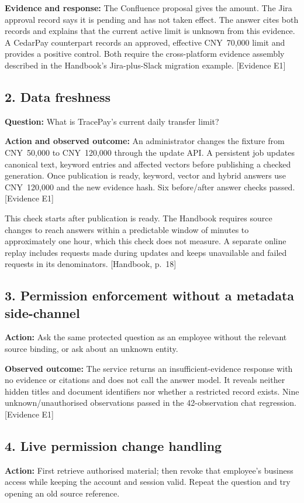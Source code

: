 \documentclass[10pt,a4paper]{article}
\newcommand{\hb}[1]{{\footnotesize\textcolor{Muted}{[Handbook, p.~#1]}}}
\newcommand{\evidence}[1]{{\footnotesize\textcolor{Muted}{[Evidence #1]}}}
\begin{document}
\textbf{Evidence and response:} The Confluence proposal gives the amount. The Jira approval record says it is pending and has not taken effect. The answer cites both records and explains that the current active limit is unknown from this evidence. A CedarPay counterpart records an approved, effective CNY~70,000 limit and provides a positive control. Both require the cross-platform evidence assembly described in the Handbook's Jira-plus-Slack migration example. \evidence{E1}

\subsection{2. Data freshness}
\textbf{Question:} What is TracePay's current daily transfer limit?

\textbf{Action and observed outcome:} An administrator changes the fixture from CNY~50,000 to CNY~120,000 through the update API. A persistent job updates canonical text, keyword entries and affected vectors before publishing a checked generation. Once publication is ready, keyword, vector and hybrid answers use CNY~120,000 and the new evidence hash. Six before/after answer checks passed. \evidence{E1}

This check starts after publication is ready. The Handbook requires source changes to reach answers within a predictable window of minutes to approximately one hour, which this check does not measure. A separate online replay includes requests made during updates and keeps unavailable and failed requests in its denominators. \hb{18}

\subsection{3. Permission enforcement without a metadata side-channel}
\textbf{Action:} Ask the same protected question as an employee without the relevant source binding, or ask about an unknown entity.

\textbf{Observed outcome:} The service returns an insufficient-evidence response with no evidence or citations and does not call the answer model. It reveals neither hidden titles and document identifiers nor whether a restricted record exists. Nine unknown/unauthorised observations passed in the 42-observation chat regression. \evidence{E1}

\subsection{4. Live permission change handling}
\textbf{Action:} First retrieve authorised material; then revoke that employee's business access while keeping the account and session valid. Repeat the question and try opening an old source reference.
\end{document}

